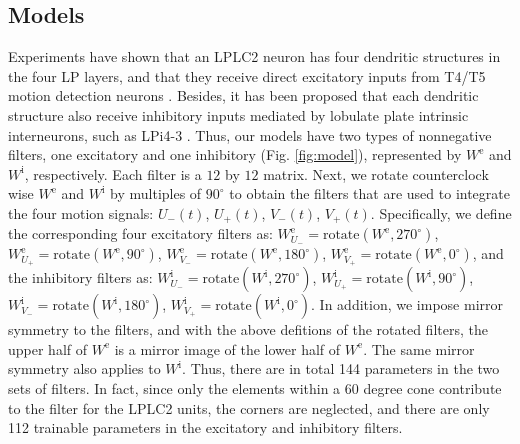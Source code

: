 \documentclass[pdftex,9pt,lineno]{elife}
\begin{document}
\subsection{Models}
Experiments have shown that an LPLC2 neuron has four dendritic structures in the four LP layers, and that they receive direct excitatory inputs from T4/T5 motion detection neurons \citep{maisak2013directional,klapoetke2017ultra}. Besides, it has been proposed that each dendritic structure also receive inhibitory inputs mediated by lobulate plate intrinsic interneurons, such as LPi4-3 \citep{klapoetke2017ultra}. Thus, our models have two types of nonnegative filters, one excitatory and one inhibitory (Fig. \ref{fig:model}), represented by $W^{\text{e}}$ and $W^{\text{i}}$, respectively. Each filter is a $12$ by $12$ matrix. Next, we rotate counterclock wise $W^{\text{e}}$ and $W^{\text{i}}$ by multiples of $90^{\circ}$ to obtain the filters that are used to integrate the four motion signals: $U_{-}(t)$, $U_{+}(t)$, $V_{-}(t)$, $V_{+}(t)$. Specifically, we define the corresponding four excitatory filters as: $W^{\text{e}}_{U_{-}}=\text{rotate}(W^{\text{e}},270^{\circ})$, $W^{\text{e}}_{U_{+}}=\text{rotate}(W^{\text{e}},90^{\circ})$, $W^{\text{e}}_{V_{-}}=\text{rotate}(W^{\text{e}},180^{\circ})$, $W^{\text{e}}_{V_{+}}=\text{rotate}(W^{\text{e}},0^{\circ})$, and the inhibitory filters as: $W^{\text{i}}_{U_{-}}=\text{rotate}(W^{\text{i}},270^{\circ})$, $W^{\text{i}}_{U_{+}}=\text{rotate}(W^{\text{i}},90^{\circ})$, $W^{\text{i}}_{V_{-}}=\text{rotate}(W^{\text{i}},180^{\circ})$, $W^{\text{i}}_{V_{+}}=\text{rotate}(W^{\text{i}},0^{\circ})$. In addition, we impose mirror symmetry to the filters, and with the above defitions of the rotated filters, the upper half of $W^{\text{e}}$ is a mirror image of the lower half of $W^{\text{e}}$. The same mirror symmetry also applies to $W^{\text{i}}$. Thus, there are in total 144 parameters in the two sets of filters. In fact, since only the elements within a 60 degree cone contribute to the filter for the LPLC2 units, the corners are neglected, and there are only 112 trainable parameters in the excitatory and inhibitory filters.


\end{document}
